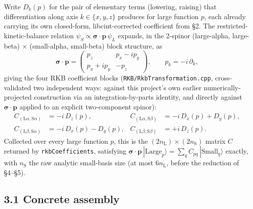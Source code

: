 \documentclass[11pt]{article}
\newcommand{\bs}[1]{\boldsymbol{#1}}
\begin{document}
Write $D_k(p)$ for the pair of elementary terms (lowering, raising) that differentiation along
axis $k\in\{x,y,z\}$ produces for large function $p$, each already carrying its own closed-form,
libcint-corrected coefficient from \S2. The restricted-kinetic-balance relation
$\psi_S\propto\bs\sigma\!\cdot\!\bs p\,\psi_L$ expands, in the 2-spinor (large-alpha, large-beta)
$\times$ (small-alpha, small-beta) block structure, as
\begin{equation}
\bs\sigma\!\cdot\!\bs p
= \begin{pmatrix} p_z & p_x - i p_y \\ p_x + i p_y & -p_z \end{pmatrix},
\qquad p_k = -i\,\partial_k ,
\end{equation}
giving the four RKB coefficient blocks (\texttt{RKB/RkbTransformation.cpp}, cross-validated two
independent ways: against this project's own earlier numerically-projected construction via an
integration-by-parts identity, and directly against $\bs\sigma\!\cdot\!\bs p$ applied to an
explicit two-component spinor):
\begin{align}
C_{(\text{L}\alpha,\text{S}\alpha)} &= -i\,D_z(p), &
C_{(\text{L}\alpha,\text{S}\beta)} &= -i\,D_x(p) + D_y(p), \\
C_{(\text{L}\beta,\text{S}\alpha)} &= -i\,D_x(p) - D_y(p), &
C_{(\text{L}\beta,\text{S}\beta)} &= +i\,D_z(p).
\end{align}
Collected over every large function $p$, this is the $(2n_{\text{L}})\times(2n_{\text{S}})$ matrix
$C$ returned by \texttt{rkbCoefficients}, satisfying
$\bs\sigma\!\cdot\!\bs p\,|\text{Large}_p\rangle = \sum_q C_{pq}\,|\text{Small}_q\rangle$ exactly,
with $n_{\text{S}}$ the raw analytic small-basis size (at most $6n_{\text{L}}$, before the
reduction of \S4--\S5).

\subsection*{3.1 Concrete assembly}
\end{document}
